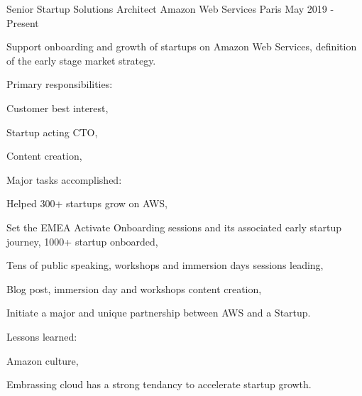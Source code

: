 

\begin{cventries}

  \cventry
    {Senior Startup Solutions Architect} %
    {Amazon Web Services} %
    {Paris} %
    {May 2019 - Present} %
    {
      \begin{cvitems} %
        \item {Support onboarding and growth of startups on Amazon Web Services, definition of the early stage market strategy.}
        \item {Primary responsibilities:}
        \begin{cvsubitems}
          \item {Customer best interest,}
          \item {Startup acting CTO,}
          \item {Content creation,}
        \end{cvsubitems}
        \item {Major tasks accomplished:}
        \begin{cvsubitems}
          \item {Helped 300+ startups grow on AWS,}
          \item {Set the EMEA Activate Onboarding sessions and its associated early startup journey, 1000+ startup onboarded,}
          \item {Tens of public speaking, workshops and immersion days sessions leading,}
          \item {Blog post, immersion day and workshops content creation,}
          \item {Initiate a major and unique partnership between AWS and a Startup.}
        \end{cvsubitems}
        \item {Lessons learned:}
        \begin{cvsubitems}
          \item {Amazon culture,}
          \item {Embrassing cloud has a strong tendancy to accelerate startup growth.}
        \end{cvsubitems}
      \end{cvitems}
    }


\end{cventries}
